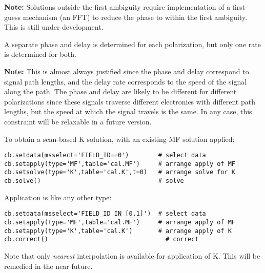 {\bf Note:} Solutions outside the first ambiguity require
implementation of a first-guess mechanism (an FFT) to reduce the phase
to within the first ambiguity.  This is still under development.

A separate phase and delay is determined for each polarization, but
only one rate is determined for both.

{\bf Note:} This is almost always justified since the phase and delay
correspond to signal path lengths, and the delay rate corresponds to
the speed of the signal along the path.  The phase and delay are
likely to be different for different polarizations since these signals
traverse different electronics with different path lengths, but the
speed at which the signal travels is the same.  In any case, this
constraint will be relaxable in a future version.

To obtain a scan-based K solution, with an existing MF solution
applied: 

\small
\begin{verbatim}
cb.setdata(msselect='FIELD_ID==0')        # select data
cb.setapply(type='MF',table='cal.MF')     # arrange apply of MF
cb.setsolve(type='K',table='cal.K',t=0)   # arrange solve for K
cb.solve()                                # solve
\end{verbatim}
\normalsize

Application is like any other type:

\small
\begin{verbatim}
cb.setdata(msselect='FIELD_ID IN [0,1]')  # select data
cb.setapply(type='MF',table='cal.MF')     # arrange apply of MF
cb.setapply(type='K',table='cal.K')       # arrange apply of K
cb.correct()                                # correct
\end{verbatim}
\normalsize

Note that only {\it nearest} interpolation is available for
application of K.  This will be remedied in the near future.

